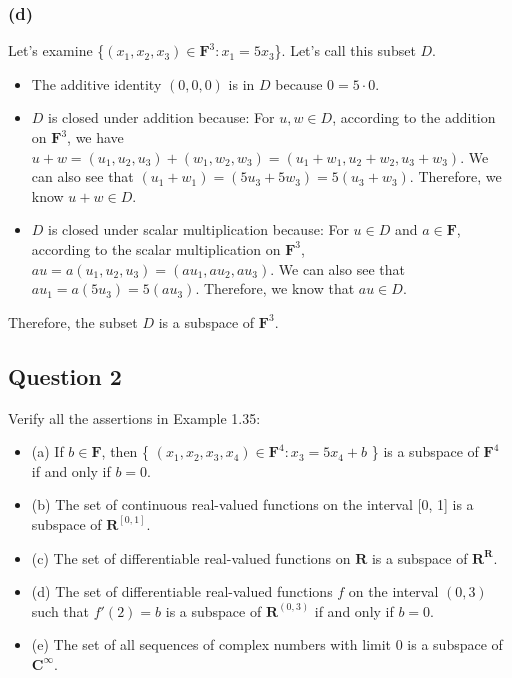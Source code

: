 \documentclass[12pt, letterpaper, oneside]{book}
\begin{document}
\subsubsection*{(d)}

Let's examine \{$(x_1, x_2, x_3) \in \mathbf{F}^3: x_1 = 5x_3$\}.
Let's call this subset $D$.

\begin{itemize}
  \item The additive identity $(0, 0, 0)$ is in $D$ because $0 = 5 \cdot 0$.
  \item $D$ is closed under addition because: For $u, w \in D$, according to
        the addition on $\mathbf{F}^3$, we have $u + w = (u_1, u_2, u_3) + (w_1,
          w_2, w_3) = (u_1 + w_1, u_2 + w_2, u_3 + w_3)$. We can also see that $(u_1
          + w_1) = (5u_3 + 5w_3) = 5(u_3 + w_3)$. Therefore, we know $u + w \in D$.
  \item $D$ is closed under scalar multiplication because: For $u \in D$ and $a
          \in \mathbf{F}$, according to the scalar multiplication on $\mathbf{F}^3$,
        $au = a(u_1, u_2, u_3) = (a u_1, a u_2, a u_3)$. We can also see that
        $a u_1 = a (5u_3) = 5(a u_3)$. Therefore, we know that $au \in D$.
\end{itemize}

Therefore, the subset $D$ is a subspace of $\mathbf{F}^3$.

\subsection{Question 2}

Verify all the assertions in Example 1.35:

\begin{itemize}
  \item (a) If $b \in \mathbf{F}$, then \{ $(x_1, x_2, x_3, x_4) \in
          \mathbf{F}^4: x_3 = 5x_4 + b$ \} is a subspace of $\mathbf{F}^4$ if and
        only if $b=0$.
  \item (b) The set of continuous real-valued functions on the interval [0, 1]
        is a subspace of $\mathbf{R}^{[0,1]}$.
  \item (c) The set of differentiable real-valued functions on $\mathbf{R}$ is
        a subspace of $\mathbf{R}^{\mathbf{R}}$.
  \item (d) The set of differentiable real-valued functions $f$ on the interval
        $(0, 3)$ such that $f'(2) = b$ is a subspace of $\mathbf{R}^{(0,3)}$ if and
        only if $b = 0$.
  \item (e) The set of all sequences of complex numbers with limit 0 is a
        subspace of $\mathbf{C}^{\infty}$.
\end{itemize}
\end{document}
